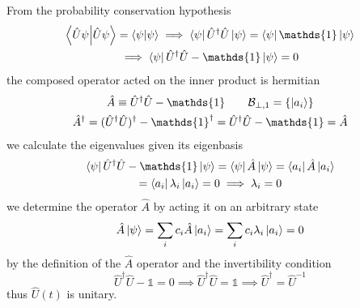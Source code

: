 \begin{multicols}{3}
   From the probability conservation hypothesis
  \begin{equation*}
    \begin{gathered}
      \braket{\hat{U}\psi} = \braket\psi \implies \bra\psi \hat{U}^\dagger \hat{U}\ket\psi = \bra\psi\mathds{1}\ket\psi \\
      \implies
      \bra\psi \hat{U}^\dagger \hat{U} - \mathds{1}\ket\psi = 0
    \end{gathered}
  \end{equation*}
  the composed operator acted on the inner product is hermitian
  \begin{equation*}
    \begin{gathered}
      \hat{A} \equiv \hat{U}^\dagger \hat{U} - \mathds{1} \qquad \mathcal{B}_{\perp, 1} = \{\ket{a_i}\} \\
      \hat{A}^\dagger
      = (\hat{U}^\dagger \hat{U})^\dagger - \mathds{1}^\dagger
      = \hat{U}^\dagger \hat{U} - \mathds{1} = \hat{A}
    \end{gathered}
  \end{equation*}
  we calculate the eigenvalues given its eigenbasis
  \begin{equation*}
    \begin{gathered}
      \bra\psi \hat{U}^\dagger \hat{U} - \mathds{1}\ket\psi = \bra\psi \hat{A} \ket\psi = \bra{a_i} \hat{A} \ket{a_i} \\
      = \bra{a_i} \lambda_i \ket{a_i} = 0 \implies \lambda_i =  0
    \end{gathered}
  \end{equation*}
  we determine the operator $\hat{A}$ by acting it on an arbitrary state
  \begin{equation*}
    \begin{gathered}
      \hat{A}\ket\psi = \sum_i c_i\hat{A}\ket{a_i} = \sum_i c_i\lambda_i\ket{a_i} = 0
    \end{gathered}
  \end{equation*}
  by the definition of the $\hat{A}$ operator and the invertibility condition
  \begin{equation*}
    \hat{U}^\dagger \hat{U} - \mathds{1} = 0 \implies \hat{U}^\dagger \hat{U} = \mathds{1} \implies \hat{U}^\dagger = \hat{U}^{-1}
  \end{equation*}
  thus $\hat{U}(t)$ is unitary. \\


\end{multicols}

